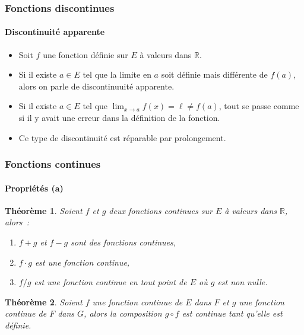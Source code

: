 \documentclass[10pt,notheorems]{beamer}
\theoremstyle{plain}
\newtheorem{theorem}{Théorème}
\theoremstyle{definition} %
\begin{document}
\begin{frame}
  \frametitle{Fonctions discontinues}
  \framesubtitle{Discontinuité apparente}

  \begin{itemize}

  \item Soit $f$ une fonction définie sur $E$ à valeurs dans $\mathbb R$.\newline

  \item Si il existe $a\in E$ tel que la limite en $a$ soit définie mais différente de $f(a)$, alors on parle de discontinuuité apparente.\newline

  \item Si il existe $a\in E$ tel que $\lim_{x\rightarrow a}f(x)=\ell\neq f(a)$, tout se passe comme si il y avait une erreur dans la définition de la fonction.\newline

  \item Ce type de discontinuité est réparable par prolongement.

  \end{itemize}

\end{frame}


\begin{frame}
  \frametitle{Fonctions continues}
  \framesubtitle{Propriétés (a)}

  \begin{theorem}
    Soient $f$ et $g$ deux fonctions continues sur $E$ à valeurs dans $\mathbb R$, alors~:\newline
    \begin{enumerate}
    \item $f+g$ et $f-g$ sont des fonctions continues,\newline
    \item $f\cdot g$ est une fonction continue,\newline
    \item $f/g$ est une fonction continue en tout point de $E$ où $g$ est non nulle.\newline
    \end{enumerate}
  \end{theorem}

  \bigskip

  \begin{theorem}
    Soient $f$ une fonction continue de $E$ dans $F$ et $g$ une fonction continue de $F$ dans $G$, alors la composition $g\circ f$ est continue tant qu'elle est définie.
  \end{theorem}

\end{frame}
\end{document}
